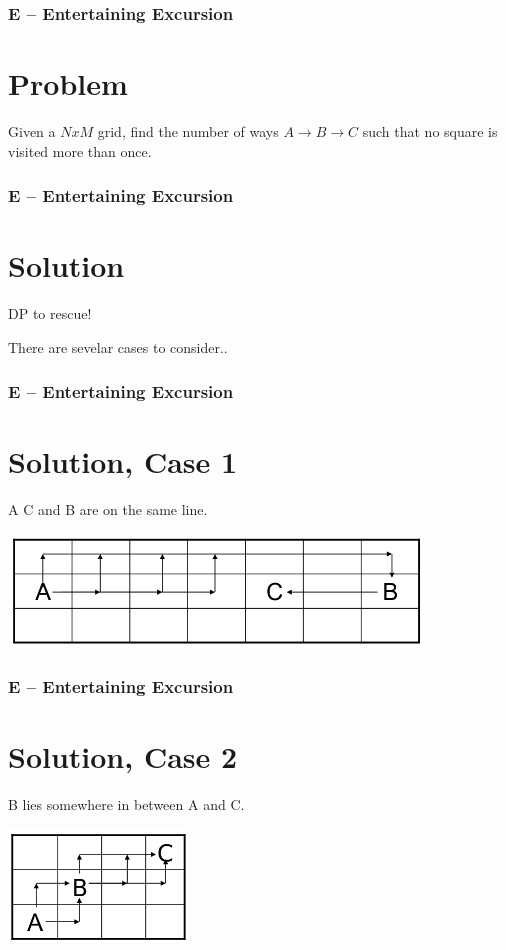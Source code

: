 \begin{frame}
  \frametitle{E -- Entertaining Excursion}
  \section*{Problem}
  Given a $NxM$ grid, find the number of ways $A \rightarrow B \rightarrow C$ such that no square is visited more than once.
\end{frame}
\begin{frame}
  \frametitle{E -- Entertaining Excursion}
  \section*{Solution}
  DP to rescue!

  There are sevelar cases to consider..
\end{frame}
\begin{frame}
  \frametitle{E -- Entertaining Excursion}
  \section*{Solution, Case 1}

  A C and B are on the same line.

  \includegraphics[height=3cm]{entertainingexcursion/case1.png}
\end{frame}
\begin{frame}
  \frametitle{E -- Entertaining Excursion}
  \section*{Solution, Case 2}

  B lies somewhere in between A and C.

  \includegraphics[height=3cm]{entertainingexcursion/case2.png}
\end{frame}
